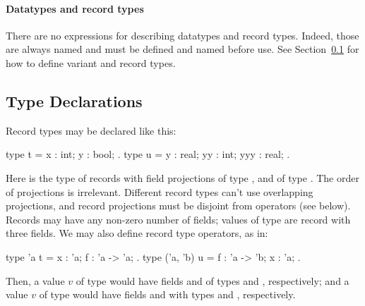 \paragraph{Datatypes and record types}

There are no expressions for describing datatypes and record types. Indeed,
those are always named and must be defined and named before use. See
Section~\ref{subsec:tydecl} for how to define variant and record types.

\subsection{Type Declarations}
\label{subsec:tydecl}

Record types may be declared like this:
\begin{easycrypt}{}{}
type t = { x : int; y : bool; }.
type u = { y : real; yy : int; yyy : real; }.
\end{easycrypt}
Here  is the type of records with field projections  of
type , and  of type . The order of projections
is irrelevant.  Different record types can't use overlapping
projections, and record projections must be disjoint from operators
(see below). Records may have any non-zero number of fields; values of
type  are record with three fields. We may also define record
type operators, as in:
\begin{easycrypt}{}{}
type 'a t = { x : 'a; f : 'a -> 'a; }.
type ('a, 'b) u = { f : 'a -> 'b; x : 'a; }.
\end{easycrypt}
Then, a value $v$ of type  would have fields  and
 of types  and , respectively; and
a value $v$ of type  would have fields  and
 with types  and , respectively.

